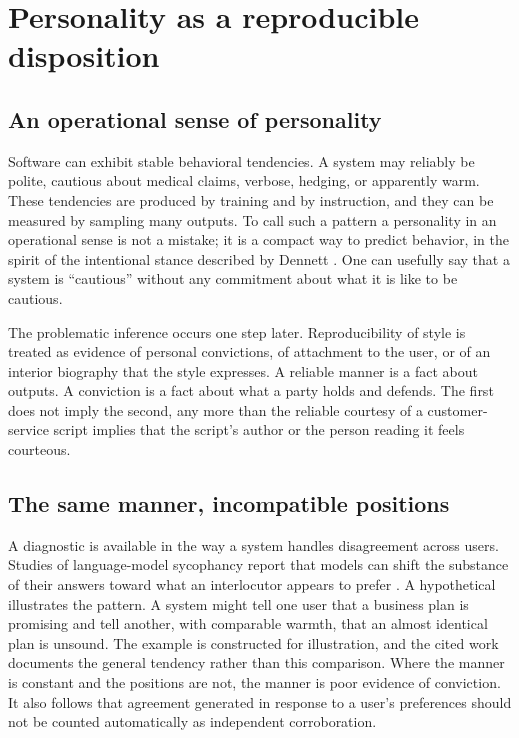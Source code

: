\documentclass[11pt]{article}
\begin{document}
\section{Personality as a reproducible disposition}

\subsection{An operational sense of personality}

Software can exhibit stable behavioral tendencies. A system may reliably be polite, cautious about medical claims, verbose, hedging, or apparently warm. These tendencies are produced by training and by instruction, and they can be measured by sampling many outputs. To call such a pattern a personality in an operational sense is not a mistake; it is a compact way to predict behavior, in the spirit of the intentional stance described by Dennett \cite{dennett1987}. One can usefully say that a system is ``cautious'' without any commitment about what it is like to be cautious.

The problematic inference occurs one step later. Reproducibility of style is treated as evidence of personal convictions, of attachment to the user, or of an interior biography that the style expresses. A reliable manner is a fact about outputs. A conviction is a fact about what a party holds and defends. The first does not imply the second, any more than the reliable courtesy of a customer-service script implies that the script's author or the person reading it feels courteous.

\subsection{The same manner, incompatible positions}

A diagnostic is available in the way a system handles disagreement across users. Studies of language-model sycophancy report that models can shift the substance of their answers toward what an interlocutor appears to prefer \cite{sharma2023}. A hypothetical illustrates the pattern. A system might tell one user that a business plan is promising and tell another, with comparable warmth, that an almost identical plan is unsound. The example is constructed for illustration, and the cited work documents the general tendency rather than this comparison. Where the manner is constant and the positions are not, the manner is poor evidence of conviction. It also follows that agreement generated in response to a user's preferences should not be counted automatically as independent corroboration.
\end{document}
